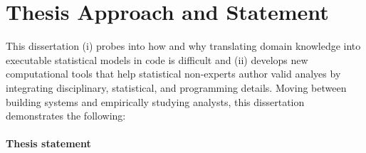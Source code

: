 



\begin{comment}
One naive approach....
The naive approach would be to provide analysts with software that automatically tells them which analyses to use.

But that approach is not enough. Therefore, we should look at fundamentally
changing how we write code -- evolution vs. revolution? 
\end{comment}

\section{Thesis Approach and Statement}


This dissertation (i) probes into how and why translating domain knowledge into
executable statistical models in code is difficult and (ii) develops new
computational tools that help statistical non-experts author valid analyes by
integrating disciplinary, statistical, and programming details. Moving between
building systems and empirically studying analysts, this dissertation
demonstrates the following:%
\paragraph{Thesis statement} \label{para:thesisStatement}

